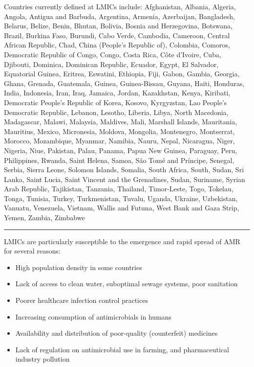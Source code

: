 \documentclass[
  11pt,
  paper=a4,
  ,captions=tableheading
]{scrartcl}
\providecommand{\tightlist}{%
  \setlength{\itemsep}{0pt}\setlength{\parskip}{0pt}}
\begin{document}
Countries currently defined at LMICs include: Afghanistan, Albania,
Algeria, Angola, Antigua and Barbuda, Argentina, Armenia, Azerbaijan,
Bangladesh, Belarus, Belize, Benin, Bhutan, Bolivia, Bosnia and
Herzegovina, Botswana, Brazil, Burkina Faso, Burundi, Cabo Verde,
Cambodia, Cameroon, Central African Republic, Chad, China (People's
Republic of), Colombia, Comoros, Democratic Republic of Congo, Congo,
Costa Rica, Côte d'Ivoire, Cuba, Djibouti, Dominica, Dominican Republic,
Ecuador, Egypt, El Salvador, Equatorial Guinea, Eritrea, Eswatini,
Ethiopia, Fiji, Gabon, Gambia, Georgia, Ghana, Grenada, Guatemala,
Guinea, Guinea-Bissau, Guyana, Haiti, Honduras, India, Indonesia, Iran,
Iraq, Jamaica, Jordan, Kazakhstan, Kenya, Kiribati, Democratic People's
Republic of Korea, Kosovo, Kyrgyzstan, Lao People's Democratic Republic,
Lebanon, Lesotho, Liberia, Libya, North Macedonia, Madagascar, Malawi,
Malaysia, Maldives, Mali, Marshall Islands, Mauritania, Mauritius,
Mexico, Micronesia, Moldova, Mongolia, Montenegro, Montserrat, Morocco,
Mozambique, Myanmar, Namibia, Nauru, Nepal, Nicaragua, Niger, Nigeria,
Niue, Pakistan, Palau, Panama, Papua New Guinea, Paraguay, Peru,
Philippines, Rwanda, Saint Helena, Samoa, São Tomé and Príncipe,
Senegal, Serbia, Sierra Leone, Solomon Islands, Somalia, South Africa,
South, Sudan, Sri Lanka, Saint Lucia, Saint Vincent and the Grenadines,
Sudan, Suriname, Syrian Arab Republic, Tajikistan, Tanzania, Thailand,
Timor-Leste, Togo, Tokelau, Tonga, Tunisia, Turkey, Turkmenistan,
Tuvalu, Uganda, Ukraine, Uzbekistan, Vanuatu, Venezuela, Vietnam, Wallis
and Futuna, West Bank and Gaza Strip, Yemen, Zambia, Zimbabwe

\begin{center}\rule{0.5\linewidth}{0.5pt}\end{center}

LMICs are particularly susceptible to the emergence and rapid spread of
AMR for several reasons:

\begin{itemize}
\tightlist
\item
  High population density in some countries
\item
  Lack of access to clean water, suboptimal sewage systems, poor
  sanitation
\item
  Poorer healthcare infection control practices
\item
  Increasing consumption of antimicrobials in humans
\item
  Availability and distribution of poor-quality (counterfeit) medicines
\item
  Lack of regulation on antimicrobial use in farming, and pharmaceutical
  industry pollution
\end{itemize}
\end{document}
